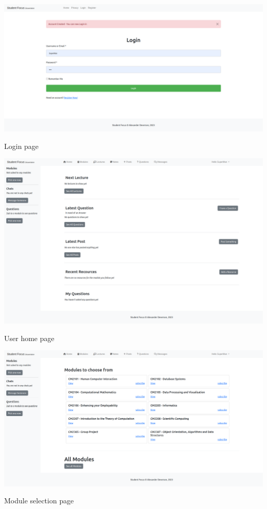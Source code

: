 \includegraphics[scale=0.20]{images/application/3 - login_after_reg.png}

Login page

\includegraphics[scale=0.20]{images/application/4 - home_empty.png}

User home page

\includegraphics[scale=0.20]{images/application/5 - module_selection.png}

Module selection page

